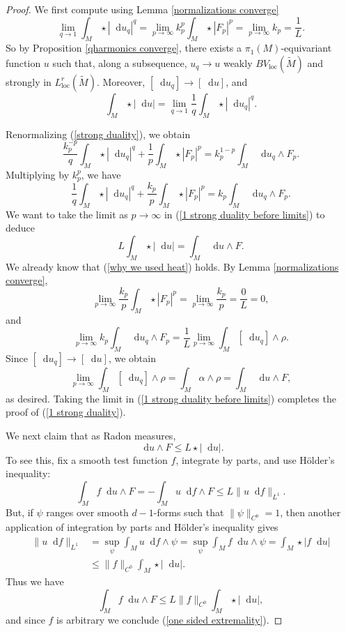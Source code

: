 \documentclass[reqno,11pt]{amsart}
\newcommand*\dif{\mathop{}\!\mathrm{d}}
\newcommand{\loc}{\mathrm{loc}}
\theoremstyle{definition}
\numberwithin{equation}{section}
\begin{document}
\begin{proof}
We first compute using Lemma \ref{normalizations converge}
\begin{equation}\label{Lqs of qLaplace converge}
\lim_{q \to 1} \int_M \star |\dif u_q|^q = \lim_{p \to \infty} k_p^p \int_M \star |F_p|^p = \lim_{p \to \infty} k_p = \frac{1}{L}.
\end{equation}
So by Proposition \ref{qharmonics converge}, there exists a $\pi_1(M)$-equivariant function $u$ such that, along a subsequence, $u_q \to u$ weakly $BV_\loc(\tilde M)$ and strongly in $L^r_\loc(\tilde M)$.
Moreover, $[\dif u_q] \to [\dif u]$, and
\begin{equation}\label{why we used heat}
	\int_M \star |\dif u| = \lim_{q \to 1} \frac{1}{q} \int_M \star |\dif u_q|^q.
\end{equation}

Renormalizing (\ref{strong duality}), we obtain 
$$\frac{k_p^{-p}}{q} \int_M \star |\dif u_q|^q + \frac{1}{p} \int_M \star |F_p|^p = k_p^{1 - p} \int_M \dif u_q \wedge F_p.$$
Multiplying by $k_p^p$, we have 
\begin{equation}\label{1 strong duality before limits}
	\frac{1}{q} \int_M \star |\dif u_q|^q + \frac{k_p}{p} \int_M \star |F_p|^p = k_p \int_M \dif u_q \wedge F_p.
\end{equation}
We want to take the limit as $p \to \infty$ in (\ref{1 strong duality before limits}) to deduce
\begin{equation}\label{1 strong duality}
	L \int_M \star |\dif u| = \int_M \dif u \wedge F.
\end{equation}
We already know that (\ref{why we used heat}) holds.
By Lemma \ref{normalizations converge},
$$\lim_{p \to \infty} \frac{k_p}{p} \int_M \star |F_p|^p = \lim_{p \to \infty} \frac{k_p}{p} = \frac{0}{L} = 0,$$
and
$$\lim_{p \to \infty} k_p \int_M \dif u_q \wedge F_p = \frac{1}{L} \lim_{p \to \infty} \int_M [\dif u_q] \wedge \rho.$$
Since $[\dif u_q] \to [\dif u]$, we obtain
$$\lim_{p \to \infty} \int_M [\dif u_q] \wedge \rho = \int_M \alpha \wedge \rho = \int_M \dif u \wedge F,$$
as desired.
Taking the limit in (\ref{1 strong duality before limits}) completes the proof of (\ref{1 strong duality}).

We next claim that as Radon measures, 
\begin{equation}\label{one sided extremality}
\dif u \wedge F \leq L \star |\dif u|.
\end{equation}
To see this, fix a smooth test function $f$, integrate by parts, and use H\"older's inequality:
$$\int_M f \dif u \wedge F = -\int_M u \dif f \wedge F \leq L \|u \dif f\|_{L^1}.$$
But, if $\psi$ ranges over smooth $d-1$-forms such that $\|\psi\|_{C^0} = 1$, then another application of integration by parts and H\"older's inequality gives
\begin{align*}
\|u \dif f\|_{L^1} &= \sup_\psi \int_M u \dif f \wedge \psi = \sup_\psi \int_M f \dif u \wedge \psi = \int_M \star |f \dif u| \\
&\leq \|f\|_{C^0} \int_M \star |\dif u|.
\end{align*}
Thus we have 
$$\int_M f \dif u \wedge F \leq L \|f\|_{C^0} \int_M \star |\dif u|,$$
and since $f$ is arbitrary we conclude (\ref{one sided extremality}).


\end{proof}
\end{document}
